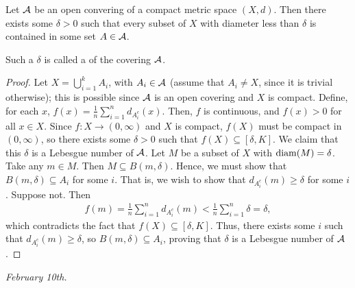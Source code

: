 \begin{lemma}
    Let $\mathcal{A}$ be an open convering of a compact metric space $(X,d)$. Then there exists some $\delta > 0$ such that every subset of $X$ with diameter less than $\delta$ is contained in some set $A \in \mathcal{A}$.
\end{lemma}
Such a $\delta$ is called a  of the covering $\mathcal{A}$.
\begin{proof}
    Let $X = \bigcup_{i=1}^{k} A_{i}$, with $A_{i} \in \mathcal{A}$ (assume that $A_{i} \neq X$, since it is trivial otherwise); this is possible since $\mathcal{A}$ is an open covering and $X$ is compact. Define, for each $x$, $f(x) = \frac{1}{n} \sum_{i=1}^{n} d_{A_{i}^{c}}(x)$. Then, $f$ is continuous, and $f(x) > 0$ for all $x \in X$. Since $f:X \to (0,\infty)$ and $X$ is compact, $f(X)$ must be compact in $(0,\infty)$, so there exists some $\delta > 0$ such that $f(X) \subseteq [\delta, K]$. We claim that this $\delta$ is a Lebesgue number of $\mathcal{A}$. Let $M$ be a subset of $X$ with $\operatorname{diam}(M) = \delta$. Take any $m \in M$. Then $M \subseteq B(m,\delta)$. Hence, we must show that $B(m,\delta) \subseteq A_{i}$ for some $i$. That is, we wish to show that $d_{A_{i}^{c}}(m) \geq \delta$ for some $i$. Suppose not. Then
    \begin{align}
        f(m) = \frac{1}{n} \sum_{i=1}^{n} d_{A_{i}^{c}}(m) < \frac{1}{n} \sum_{i=1}^{n} \delta = \delta,
    \end{align}
    which contradicts the fact that $f(X) \subseteq [\delta, K]$. Thus, there exists some $i$ such that $d_{A_{i}^{c}}(m) \geq \delta$, so $B(m,\delta) \subseteq A_{i}$, proving that $\delta$ is a Lebesgue number of $\mathcal{A}$.
\end{proof}

\textit{February 10th.}

